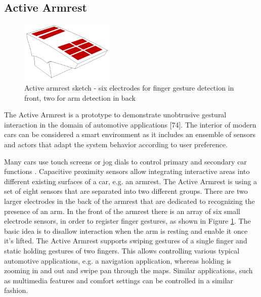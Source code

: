 \subsection{Active Armrest}
\begin{figure}[h]
\centering
\includegraphics[width=0.4\textwidth]{images/active_armrest}
\caption{Active armrest sketch - six electrodes for finger gesture detection in front, two for arm detection in back}
\label{fig:armrest_sketch}
\end{figure}
The Active Armrest is a prototype to demonstrate unobtrusive gestural interaction in the domain of automotive applications [74]. The interior of modern cars can be considered a smart environment as it includes an ensemble of sensors and actors that adapt the system behavior according to user preference.
 
Many cars use touch screens or jog dials to control primary and secondary car functions \cite{schmidt2010automotive}. Capacitive proximity sensors allow integrating interactive areas into different existing surfaces of a car, e.g. an armrest. The Active Armrest is using a set of eight sensors that are separated into two different groups. There are two larger electrodes in the back of the armrest that are dedicated to recognizing the presence of an arm. In the front of the armrest there is an array of six small electrode sensors, in order to register finger gestures, as shown in Figure \ref{fig:armrest_sketch}. The basic idea is to disallow interaction when the arm is resting and enable it once it's lifted. The Active Armrest supports swiping gestures of a single finger and static holding gestures of two fingers. This allows controlling various typical automotive applications, e.g. a navigation application, whereas holding is zooming in and out and swipe pan through the maps. Similar applications, such as multimedia features and comfort settings can be controlled in a similar fashion.

